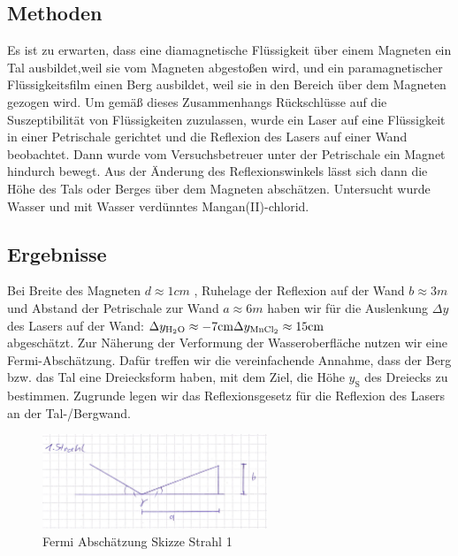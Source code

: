 \documentclass[
	a4paper,
	12pt,
	pagesize,
	ngerman
]{scrartcl}
\begin{document}
	\subsection{Methoden}
	Es ist zu erwarten, dass eine diamagnetische Flüssigkeit über einem Magneten ein Tal ausbildet,weil sie vom Magneten abgestoßen wird, und ein paramagnetischer Flüssigkeitsfilm einen Berg ausbildet, weil sie in den Bereich über dem Magneten gezogen wird. 
	Um gemäß dieses Zusammenhangs Rückschlüsse auf die Suszeptibilität von Flüssigkeiten zuzulassen, wurde ein Laser auf eine Flüssigkeit in einer Petrischale gerichtet und die Reflexion des Lasers auf einer Wand beobachtet. Dann wurde vom Versuchsbetreuer unter der Petrischale ein Magnet hindurch bewegt. Aus der Änderung des Reflexionswinkels lässt sich dann die Höhe des Tals oder Berges über dem Magneten abschätzen. Untersucht wurde Wasser und mit Wasser verdünntes Mangan(II)-chlorid.
	\subsection{Ergebnisse}
	Bei Breite des Magneten $d \approx 1 \si{cm}$ , Ruhelage der Reflexion auf der Wand $b \approx 3 \si{m}$ und Abstand der Petrischale zur Wand $a \approx 6 \si{m}$ haben wir für die Auslenkung $\Delta y$ des Lasers auf der Wand: \newline
	$ \Delta y_\text{\ce{H2O}} \approx -7 \si{cm} \\
	\Delta y_\text{\ce{MnCl2}} \approx 15 \si{cm}$\\
	abgeschätzt.
	Zur Näherung der Verformung der Wasseroberfläche nutzen wir eine Fermi-Abschätzung. Dafür treffen wir die vereinfachende Annahme, dass der Berg bzw. das Tal eine Dreiecksform haben, mit dem Ziel, die Höhe $y_\text{S}$ des Dreiecks zu bestimmen. Zugrunde legen wir das Reflexionsgesetz für die Reflexion des Lasers an der Tal-/Bergwand.\\
	\begin{figure}[htb]
	  \centering
	    \includegraphics[width=0.6\textwidth]{Fermi1} 
	  \caption{Fermi Abschätzung Skizze Strahl 1}
	\end{figure}
		
\end{document}
